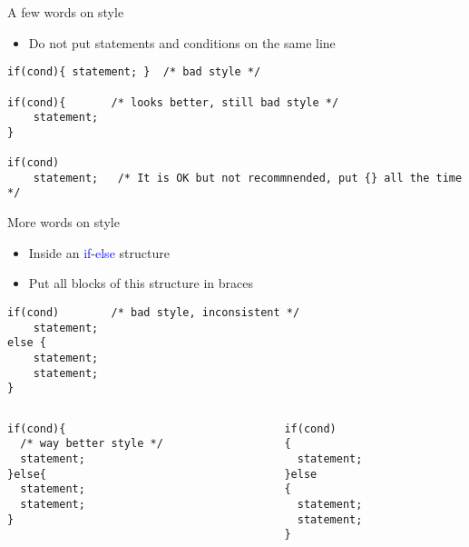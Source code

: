 \begin{frame}[fragile]{A few words on style}
	\begin{itemize}
		\item {Do not put statements and conditions on the same line}
	\end{itemize}
	\begin{lstlisting}[numbers=none]
if(cond){ statement; }	/* bad style */

if(cond){		/* looks better, still bad style */
    statement;
}

if(cond)
	statement;   /* It is OK but not recommnended, put {} all the time */
\end{lstlisting}
\end{frame}

\begin{frame}[fragile]{More words on style}
	\begin{itemize}
		\item {Inside an \textcolor{blue}{if}-\textcolor{blue}{else} structure}
		\item {Put all blocks of this structure in braces}
	\end{itemize}
\begin{lstlisting}[numbers=none]
if(cond)		/* bad style, inconsistent */
    statement;
else {
    statement;
    statement;
}
\end{lstlisting}
\vspace{-0.3in}
\begin{columns}
\begin{column}{0.45\linewidth}
\begin{lstlisting}[numbers=none]
if(cond){  
  /* way better style */
  statement;
}else{
  statement;
  statement;
}
\end{lstlisting}
\end{column}
\begin{column}{0.45\linewidth}
\begin{lstlisting}[numbers=none]
if(cond)
{
  statement;
}else
{
  statement;
  statement;
}
\end{lstlisting}
\end{column}
\end{columns}
\end{frame}


